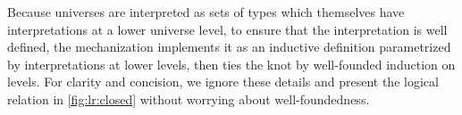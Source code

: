 \documentclass[a4paper,UKenglish,cleveref,autoref,thm-restate]{lipics-v2021}
\begin{document}
Because universes are interpreted as sets of types
which themselves have interpretations at a lower universe level,
to ensure that the interpretation is well defined,
the mechanization implements it as an inductive definition
parametrized by interpretations at lower levels,
then ties the knot by well-founded induction on levels.
For clarity and concision, we ignore these details
and present the logical relation in \cref{fig:lr:closed}
without worrying about well-foundedness.

\begin{figure}
\end{figure}
\end{document}
